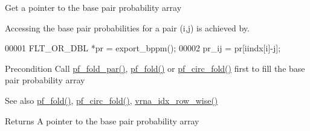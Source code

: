 Get a pointer to the base pair probability array

Accessing the base pair probabilities for a pair (i,j) is achieved by. 


\begin{DoxyCode}
00001 FLT\_OR\_DBL *pr  = export\_bppm();
00002 pr\_ij           = pr[iindx[i]-j];
\end{DoxyCode}


\begin{DoxyPrecond}{Precondition}
Call \hyperlink{group__pf__fold_gac4f95bee734b2563a3d6e9932117ebdf}{pf\+\_\+fold\+\_\+par()}, \hyperlink{group__pf__fold_gadc3db3d98742427e7001a7fd36ef28c2}{pf\+\_\+fold()} or \hyperlink{group__pf__fold_ga819ce5fca8984004ac81c4a3b04cb735}{pf\+\_\+circ\+\_\+fold()} first to fill the base pair probability array
\end{DoxyPrecond}
\begin{DoxySeeAlso}{See also}
\hyperlink{group__pf__fold_gadc3db3d98742427e7001a7fd36ef28c2}{pf\+\_\+fold()}, \hyperlink{group__pf__fold_ga819ce5fca8984004ac81c4a3b04cb735}{pf\+\_\+circ\+\_\+fold()}, \hyperlink{group__utils_ga70b180e9ea764218a82647a1cd347445}{vrna\+\_\+idx\+\_\+row\+\_\+wise()}
\end{DoxySeeAlso}
\begin{DoxyReturn}{Returns}
A pointer to the base pair probability array 
\end{DoxyReturn}
